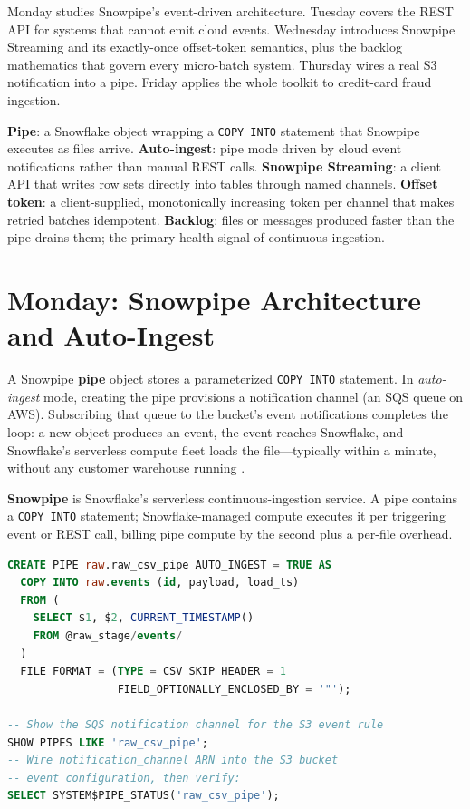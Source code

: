 Monday studies Snowpipe's event-driven architecture. Tuesday covers the REST API for systems that cannot emit cloud events. Wednesday introduces Snowpipe Streaming and its exactly-once offset-token semantics, plus the backlog mathematics that govern every micro-batch system. Thursday wires a real S3 notification into a pipe. Friday applies the whole toolkit to credit-card fraud ingestion.

\begin{keyterms}
\textbf{Pipe}: a Snowflake object wrapping a \texttt{COPY INTO} statement that Snowpipe executes as files arrive.\quad
\textbf{Auto-ingest}: pipe mode driven by cloud event notifications rather than manual REST calls.\quad
\textbf{Snowpipe Streaming}: a client API that writes row sets directly into tables through named channels.\quad
\textbf{Offset token}: a client-supplied, monotonically increasing token per channel that makes retried batches idempotent.\quad
\textbf{Backlog}: files or messages produced faster than the pipe drains them; the primary health signal of continuous ingestion.
\end{keyterms}

\section{Monday: Snowpipe Architecture and Auto-Ingest}
A Snowpipe \textbf{pipe} object stores a parameterized \texttt{COPY INTO} statement. In \emph{auto-ingest} mode, creating the pipe provisions a notification channel (an SQS queue on AWS). Subscribing that queue to the bucket's event notifications completes the loop: a new object produces an event, the event reaches Snowflake, and Snowflake's serverless compute fleet loads the file---typically within a minute, without any customer warehouse running \cite{snowflakeSnowpipeDocs}.

\begin{definitionbox}
\textbf{Snowpipe} is Snowflake's serverless continuous-ingestion service. A pipe contains a \texttt{COPY INTO} statement; Snowflake-managed compute executes it per triggering event or REST call, billing pipe compute by the second plus a per-file overhead.
\end{definitionbox}

\begin{lstlisting}[language=SQL, caption={Snowpipe auto-ingest with SQS notification}]
CREATE PIPE raw.raw_csv_pipe AUTO_INGEST = TRUE AS
  COPY INTO raw.events (id, payload, load_ts)
  FROM (
    SELECT $1, $2, CURRENT_TIMESTAMP()
    FROM @raw_stage/events/
  )
  FILE_FORMAT = (TYPE = CSV SKIP_HEADER = 1
                 FIELD_OPTIONALLY_ENCLOSED_BY = '"');

-- Show the SQS notification channel for the S3 event rule
SHOW PIPES LIKE 'raw_csv_pipe';
-- Wire notification_channel ARN into the S3 bucket
-- event configuration, then verify:
SELECT SYSTEM$PIPE_STATUS('raw_csv_pipe');
\end{lstlisting}

